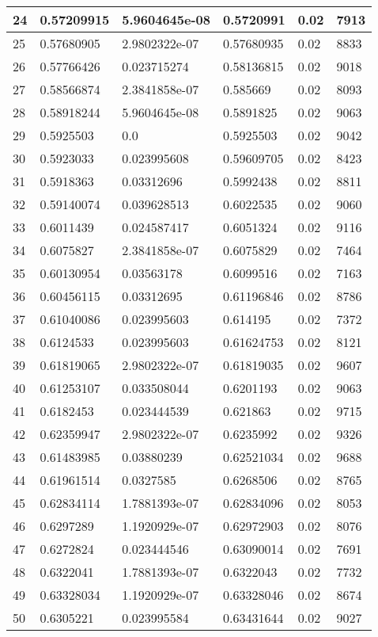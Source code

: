 \begin{longtable}{|l|l|l|l|l|l|}
24 & 0.57209915 & 5.9604645e-08 & 0.5720991 & 0.02 & 7913 \\ \hline 
25 & 0.57680905 & 2.9802322e-07 & 0.57680935 & 0.02 & 8833 \\ \hline 
26 & 0.57766426 & 0.023715274 & 0.58136815 & 0.02 & 9018 \\ \hline 
27 & 0.58566874 & 2.3841858e-07 & 0.585669 & 0.02 & 8093 \\ \hline 
28 & 0.58918244 & 5.9604645e-08 & 0.5891825 & 0.02 & 9063 \\ \hline 
29 & 0.5925503 & 0.0 & 0.5925503 & 0.02 & 9042 \\ \hline 
30 & 0.5923033 & 0.023995608 & 0.59609705 & 0.02 & 8423 \\ \hline 
31 & 0.5918363 & 0.03312696 & 0.5992438 & 0.02 & 8811 \\ \hline 
32 & 0.59140074 & 0.039628513 & 0.6022535 & 0.02 & 9060 \\ \hline 
33 & 0.6011439 & 0.024587417 & 0.6051324 & 0.02 & 9116 \\ \hline 
34 & 0.6075827 & 2.3841858e-07 & 0.6075829 & 0.02 & 7464 \\ \hline 
35 & 0.60130954 & 0.03563178 & 0.6099516 & 0.02 & 7163 \\ \hline 
36 & 0.60456115 & 0.03312695 & 0.61196846 & 0.02 & 8786 \\ \hline 
37 & 0.61040086 & 0.023995603 & 0.614195 & 0.02 & 7372 \\ \hline 
38 & 0.6124533 & 0.023995603 & 0.61624753 & 0.02 & 8121 \\ \hline 
39 & 0.61819065 & 2.9802322e-07 & 0.61819035 & 0.02 & 9607 \\ \hline 
40 & 0.61253107 & 0.033508044 & 0.6201193 & 0.02 & 9063 \\ \hline 
41 & 0.6182453 & 0.023444539 & 0.621863 & 0.02 & 9715 \\ \hline 
42 & 0.62359947 & 2.9802322e-07 & 0.6235992 & 0.02 & 9326 \\ \hline 
43 & 0.61483985 & 0.03880239 & 0.62521034 & 0.02 & 9688 \\ \hline 
44 & 0.61961514 & 0.0327585 & 0.6268506 & 0.02 & 8765 \\ \hline 
45 & 0.62834114 & 1.7881393e-07 & 0.62834096 & 0.02 & 8053 \\ \hline 
46 & 0.6297289 & 1.1920929e-07 & 0.62972903 & 0.02 & 8076 \\ \hline 
47 & 0.6272824 & 0.023444546 & 0.63090014 & 0.02 & 7691 \\ \hline 
48 & 0.6322041 & 1.7881393e-07 & 0.6322043 & 0.02 & 7732 \\ \hline 
49 & 0.63328034 & 1.1920929e-07 & 0.63328046 & 0.02 & 8674 \\ \hline 
50 & 0.6305221 & 0.023995584 & 0.63431644 & 0.02 & 9027 \\ \hline 
\end{longtable}